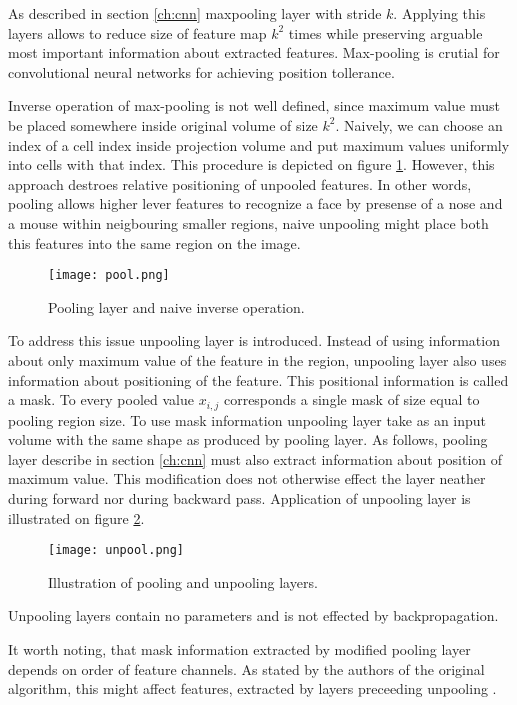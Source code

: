 As described in section \ref{ch:cnn} maxpooling layer with stride $k$.
Applying this layers allows to reduce size of feature map $k^2$ times while preserving arguable most important information about extracted features.
Max-pooling is crutial for convolutional neural networks for achieving position tollerance.

Inverse operation of max-pooling is not well defined, since maximum value must be placed somewhere inside original volume of size $k^2$. Naively, we can choose an index of a cell index inside projection volume and put maximum values uniformly into cells with that index.
This procedure is depicted on figure \ref{fig:pool}.
However, this approach destroes relative positioning of unpooled features.
In other words, pooling allows higher lever features to recognize a face by presense of a nose and a mouse within neigbouring smaller regions, naive unpooling might place both this features into the same region on the image.

\begin{figure}[h!]
  \centering
    \texttt{[image: pool.png]}
  \caption{Pooling layer and naive inverse operation.}
  \label{fig:pool}
\end{figure}

To address this issue unpooling layer is introduced. Instead of using information about only maximum value of the feature in the region, unpooling layer also uses information about positioning of the feature. This positional information is called a mask. To every pooled value $x_{i,j}$ corresponds a single mask of size equal to pooling region size. To use mask information  unpooling layer take as an input volume with the same shape as produced by pooling layer. As follows, pooling layer describe in section \ref{ch:cnn} must also extract information about position of maximum value. This modification does not otherwise effect the layer neather during forward nor during backward pass. Application of unpooling layer is illustrated on figure \ref{fig:unpool}.

\begin{figure}[h!]
  \centering
    \texttt{[image: unpool.png]}
  \caption{Illustration of pooling and unpooling layers.}
  \label{fig:unpool}
\end{figure}

Unpooling layers contain no parameters and is not effected by backpropagation.

It worth noting, that mask information extracted by modified pooling layer depends on order of feature channels. As stated by the authors of the original algorithm, this might affect features, extracted by layers preceeding unpooling \cite{Zhao2015}.

